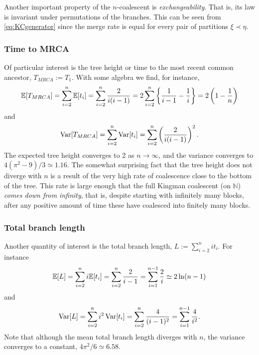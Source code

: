 Another important property of the $n$-coalescent is \emph{exchangeability}. That is, its law is invariant under permutations of the branches. This can be seen from \eqref{eq:KCgenerator} since the merge rate is equal for every pair of partitions $\xi \prec \eta$.


\subsubsection{Time to MRCA}
Of particular interest is the tree height or time to the most recent common ancestor, $T_{MRCA} := T_1$.
With some algebra we find, for instance,
\begin{equation*}
\mathbb{E}[ T_{MRCA} ] 
= \sum_{i=2}^{n} \mathbb{E}[t_i]
= \sum_{i=2}^n \frac{2}{i(i-1)}
= 2 \sum_{i=2}^n \left\{ \frac{1}{i-1} - \frac{1}{i} \right\}
= 2 \left( 1 - \frac{1}{n} \right)
\end{equation*}
and
\begin{equation*}
\operatorname{Var}[ T_{MRCA} ] 
= \sum_{i=2}^n \operatorname{Var}[t_i]
= \sum_{i=2}^n \left( \frac{2}{i(i-1)} \right)^2 .
\end{equation*}
The expected tree height converges to 2 as $n\to\infty$, and the variance converges to $4(\pi^2 - 9)/3 \simeq 1.16$.
The somewhat surprising fact that the tree height does not diverge with $n$ is a result of the very high rate of coalescence close to the bottom of the tree. This rate is large enough that the full Kingman coalescent (on $\mathbb{N}$) \emph{comes down from infinity}, that is, despite starting with infinitely many blocks, after any positive amount of time these have coalesced into finitely many blocks.


\subsubsection{Total branch length}
Another quantity of interest is the total branch length,
$ L := \sum_{i=2}^n i t_i $.
For instance
\begin{equation*}
\E[ L ] 
= \sum_{i=2}^n i \E[ t_i ]
= \sum_{i=2}^n \frac{2}{i-1}
= \sum_{i=1}^{n-1} \frac{2}{i} %
\simeq 2 \ln(n-1) 
\end{equation*}
and
\begin{equation*}
\operatorname{Var}[ L ] 
= \sum_{i=2}^n i^2 \operatorname{Var}[ t_i ]
= \sum_{i=2}^n \frac{4}{(i-1)^2}
= \sum_{i=1}^{n-1} \frac{4}{i^2} .
\end{equation*}
Note that although the mean total branch length diverges with $n$, the variance converges to a constant, $4\pi^2 /6 \simeq 6.58$.


